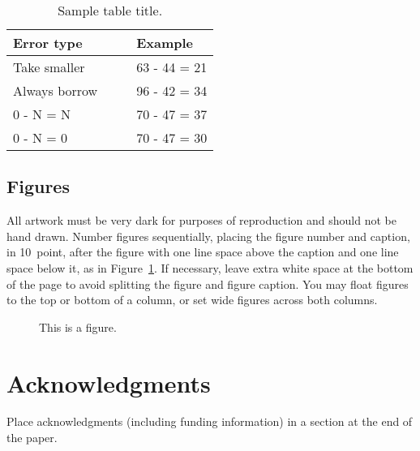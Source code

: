 \documentclass[10pt,letterpaper]{article}
\begin{document}
\begin{table}[!ht]
\begin{center} 
\caption{Sample table title.} 
\label{sample-table} 
\vskip 0.12in
\begin{tabular}{ll} 
\hline
Error type    &  Example \\
\hline
Take smaller        &   63 - 44 = 21 \\
Always borrow~~~~   &   96 - 42 = 34 \\
0 - N = N           &   70 - 47 = 37 \\
0 - N = 0           &   70 - 47 = 30 \\
\hline
\end{tabular} 
\end{center} 
\end{table}


\subsection{Figures}

All artwork must be very dark for purposes of reproduction and should
not be hand drawn. Number figures sequentially, placing the figure
number and caption, in 10~point, after the figure with one line space
above the caption and one line space below it, as in
Figure~\ref{sample-figure}. If necessary, leave extra white space at
the bottom of the page to avoid splitting the figure and figure
caption. You may float figures to the top or bottom of a column, or
set wide figures across both columns.

\begin{figure}[ht]
\begin{center}
\end{center}
\caption{This is a figure.} 
\label{sample-figure}
\end{figure}


\section{Acknowledgments}

Place acknowledgments (including funding information) in a section at
the end of the paper.






\setlength{\bibleftmargin}{.125in}
\setlength{\bibindent}{-\bibleftmargin}


\end{document}
